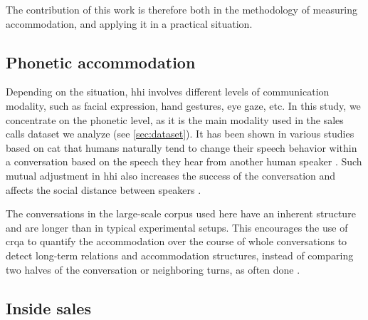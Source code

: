 The contribution of this work is therefore both in the methodology of measuring accommodation, and applying it in a practical situation.


\subsection{Phonetic accommodation}
\label{subsec:phonetic_accommodation}

Depending on the situation, \ac{hhi} involves different levels of communication modality, such as facial expression, hand gestures, eye gaze, etc.
In this study, we concentrate on the phonetic level, as it is the main modality used in the sales calls dataset we analyze (see \cref{sec:dataset}).
It has been shown in various studies based on \ac{cat} \citep{Giles1991CAT,Gallois2015CAT} that humans naturally tend to change their speech behavior within a conversation based on the speech they hear from another human speaker \citep{Bailly2010speech,Babel2014novelty}.
Such mutual adjustment in \ac{hhi} also increases the success of the conversation \citep{Pickering2004toward} and affects the social distance between speakers \citep{Schweitzer2017social}.

The conversations in the large-scale corpus used here have an inherent structure and are longer than in typical experimental setups.
This encourages the use of \ac{crqa} to quantify the accommodation over the course of whole conversations to detect long-term relations and accommodation structures, instead of comparing two halves of the conversation or neighboring turns, as often done \citep{Levitan2013entrainment,Rahimi2018weighting}.


\subsection{Inside sales}
\label{subsec:inside_sales}

